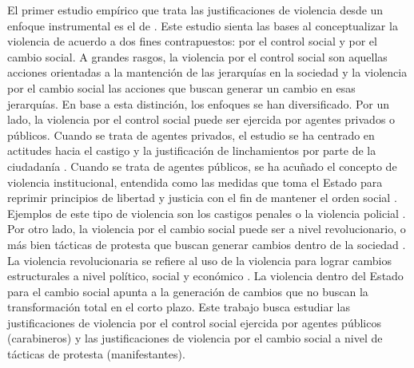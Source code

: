 \documentclass[12pt,twoside]{templates/facsothesis}
\begin{document}
El primer estudio empírico que trata las justificaciones de violencia desde un enfoque instrumental es el de \citet{Blumenthal1972}. Este estudio sienta las bases al conceptualizar la violencia de acuerdo a dos fines contrapuestos: por el control social y por el cambio social. A grandes rasgos, la violencia por el control social son aquellas acciones orientadas a la mantención de las jerarquías en la sociedad y la violencia por el cambio social las acciones que buscan generar un cambio en esas jerarquías. En base a esta distinción, los enfoques se han diversificado. Por un lado, la violencia por el control social puede ser ejercida por agentes privados o públicos. Cuando se trata de agentes privados, el estudio se ha centrado en actitudes hacia el castigo y la justificación de linchamientos por parte de la ciudadanía \citep[e.g.][]{Gerber2012, Gerber2016, Puga2016}. Cuando se trata de agentes públicos, se ha acuñado el concepto de violencia institucional, entendida como las medidas que toma el Estado para reprimir principios de libertad y justicia con el fin de mantener el orden social \citep{Nielsen1981}. Ejemplos de este tipo de violencia son los castigos penales o la violencia policial \citep{Puga2016}. Por otro lado, la violencia por el cambio social puede ser a nivel revolucionario, o más bien tácticas de protesta que buscan generar cambios dentro de la sociedad \citep{Nielsen1981}. La violencia revolucionaria se refiere al uso de la violencia para lograr cambios estructurales a nivel político, social y económico \citep[ver][]{Nielsen1977, Sune2010, Edyvane2020}. La violencia dentro del Estado para el cambio social apunta a la generación de cambios que no buscan la transformación total en el corto plazo. Este trabajo busca estudiar las justificaciones de violencia por el control social ejercida por agentes públicos (carabineros) y las justificaciones de violencia por el cambio social a nivel de tácticas de protesta (manifestantes).
\end{document}
